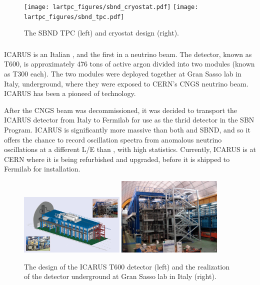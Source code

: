 \begin{figure}[htb]
  \centering
  \texttt{[image: lartpc\_figures/sbnd\_cryostat.pdf]}
  \texttt{[image: lartpc\_figures/sbnd\_tpc.pdf]}
  \caption[\sbnd Design]{The SBND TPC (left) and cryostat design (right).}
  \label{fig:sbnd_det}
\end{figure}


\subsubsection{\label{subsec:sbnd} \icarus}

ICARUS is an Italian \lartpc, and the first \lartpc in a neutrino beam.  The detector, known as T600, is approximately 476 tons of active argon divided into two modules (known as T300 each).  The two modules were deployed together at Gran Sasso lab in Italy, underground, where they were exposed to CERN's CNGS neutrino beam.  ICARUS has been a pioneed of \lartpc technology.

After the CNGS beam was decommissioned, it was decided to transport the ICARUS detector from Italy to Fermilab for use as the thrid detector in the SBN Program.  ICARUS is significantly more massive than both \uboone and SBND, and so it offers the chance to record oscillation spectra from anomalous neutrino oscillations at a different L/E than \uboone, with high statistics.  Currently, ICARUS is at CERN where it is being refurbished and upgraded, before it is shipped to Fermilab for installation.

\begin{figure}[htb]
  \centering
  \includegraphics[width=0.45\textwidth]{lartpc_figures/icarus.jpg}
  \includegraphics[width=0.45\textwidth]{lartpc_figures/icarus_real.png}
  \caption[ICARUS T600]{The design of the ICARUS T600 detector (left) and the realization of the detector underground at Gran Sasso lab in Italy (right).}
  \label{fig:sbnd_det}
\end{figure}



